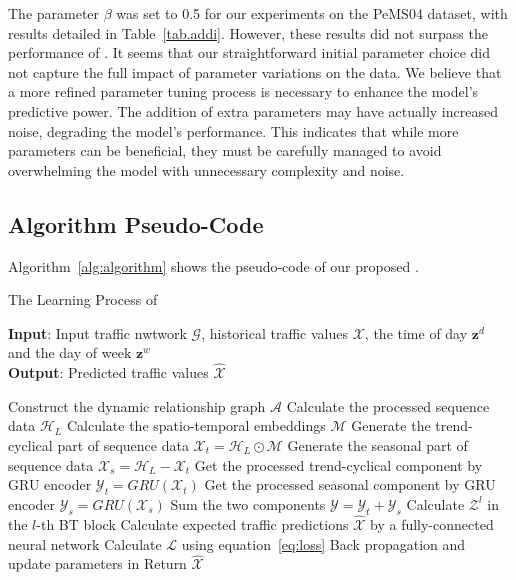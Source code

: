 The parameter $\beta$ was set to 0.5 for our experiments on the PeMS04 dataset, with results detailed in Table~\ref{tab.addi}. However, these results did not surpass the performance of \model. It seems that our straightforward initial parameter choice did not capture the full impact of parameter variations on the data. We believe that a more refined parameter tuning process is necessary to enhance the model's predictive power. The addition of extra parameters may have actually increased noise, degrading the model's performance. This indicates that while more parameters can be beneficial, they must be carefully managed to avoid overwhelming the model with unnecessary complexity and noise.




\subsection{Algorithm Pseudo-Code}
Algorithm~\ref{alg:algorithm} shows the pseudo-code of our proposed \model.

\begin{algorithm}[http]
\caption{The Learning Process of \model}
\label{alg:algorithm}
\textbf{Input}: Input traffic nwtwork $\mathcal{G}$, historical traffic values $\bm{\mathcal{X}}$, the time of day $\mathbf{z}^{d}$ and the day of week $\mathbf{z}^{w}$\\
\textbf{Output}: Predicted traffic values $\bm{\mathcal{\hat{X}}}$
\begin{algorithmic}[1] %
\STATE Construct the dynamic relationship graph $\bm{\mathcal{A}}$
\STATE Calculate the processed sequence data $\bm{\mathcal{H}}_L$
\STATE Calculate the spatio-temporal embeddings $\bm{\mathcal{M}}$ 
\STATE Generate the trend-cyclical part of sequence data $\bm{\mathcal{X}}_{t} = \bm{\mathcal{H}}_L \odot \bm{\mathcal{M}}$
\STATE Generate the seasonal part of sequence data $\bm{\mathcal{X}}_{s} = \bm{\mathcal{H}}_L - \bm{\mathcal{X}}_{t}$
\STATE Get the processed trend-cyclical component by GRU encoder $\bm{\mathcal{Y}}_{t} = GRU(\bm{\mathcal{X}}_{t})$
\STATE Get the processed seasonal component by GRU encoder $\bm{\mathcal{Y}}_{s} = GRU(\bm{\mathcal{X}}_{s})$
\STATE Sum the two components $\bm{\mathcal{Y}} = \bm{\mathcal{Y}}_{t} + \bm{\mathcal{Y}}_{s}$
\STATE Calculate $\bm{\mathcal{Z}}^{l}$ in the $l$-th BT block 
\ENDFOR
\STATE Calculate expected traffic predictions $\bm{\mathcal{\hat{X}}}$ by a fully-connected neural network
\STATE Calculate $\mathcal{L}$ using equation~\ref{eq:loss}
\STATE Back propagation and update parameters in \model
\STATE Return $\bm{\mathcal{\hat{X}}}$
\end{algorithmic}
\end{algorithm}


